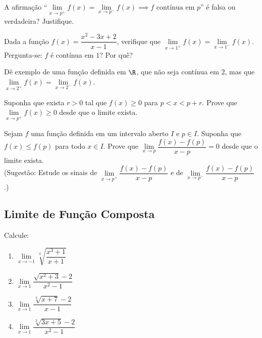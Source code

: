 \begin{exercicio}[2]
A afirmação ``$\lim\limits_{x \to p^+} f(x) = \lim\limits_{x \to p^-} f(x) \implies f \text{ contínua em } p$'' é falsa ou verdadeira? Justifique.
\end{exercicio}

\begin{exercicio}[3]
Dada a função $f(x) = \dfrac{x^2 - 3x + 2}{x - 1}$, verifique que $\lim\limits_{x \to 1^+} f(x) = \lim\limits_{x \to 1^-} f(x)$. Pergunta-se: $f$ é contínua em $1$? Por quê?
\end{exercicio}

\begin{exercicio}[4]
Dê exemplo de uma função definida em $\R$, que não seja contínua em $2$, mas que $\lim\limits_{x \to 2^+} f(x) = \lim\limits_{x \to 2^-} f(x)$.
\end{exercicio}

\begin{exercicio}[5]
Suponha que exista $r > 0$ tal que $f(x) \ge 0$ para $p < x < p + r$. Prove que $\lim\limits_{x \to p^+} f(x) \ge 0$ desde que o limite exista.
\end{exercicio}

\begin{exercicio}[6]
Sejam $f$ uma função definida em um intervalo aberto $I$ e $p \in I$. Suponha que $f(x) \le f(p)$ para todo $x \in I$. Prove que $\lim\limits_{x \to p} \dfrac{f(x) - f(p)}{x - p} = 0$ desde que o limite exista.\\
(Sugestão: Estude os sinais de $\lim\limits_{x \to p^+} \dfrac{f(x) - f(p)}{x - p}$ e de $\lim\limits_{x \to p^-} \dfrac{f(x) - f(p)}{x - p}$.)
\end{exercicio}

\clearpage

\subsection{Limite de Função Composta}

\begin{exercicio}[1]
Calcule:
\begin{enumerate}[label=\alph*)]
    \item $\lim\limits_{x \to -1} \sqrt[3]{\dfrac{x^3 + 1}{x + 1}}$
    \item $\lim\limits_{x \to 1} \dfrac{\sqrt{x^2 + 3} - 2}{x^2 - 1}$
    \item $\lim\limits_{x \to 1} \dfrac{\sqrt[3]{x + 7} - 2}{x - 1}$
    \item $\lim\limits_{x \to 1} \dfrac{\sqrt[3]{3x + 5} - 2}{x^2 - 1}$
\end{enumerate}
\end{exercicio}

